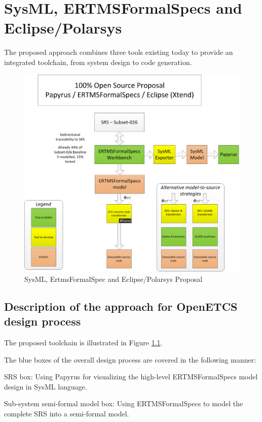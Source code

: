 \chapter{SysML, ERTMSFormalSpecs and Eclipse/Polarsys}
\label{sec:sysML-EFS}

The proposed approach combines three tools existing today to provide an integrated toolchain, from system design 
to code generation.

\begin{figure}
	\centering
		\includegraphics[width=1.10\textwidth]{images/ERTMSFormalSpecsProposal_V2.png}
		\caption{SysML, ErtmsFormalSpec and Eclipse/Polarsys Proposal}
	\label{fig:ERTMSFormalSpecsProposal}
\end{figure}

\section{Description of the approach for OpenETCS design process}

The proposed toolchain is illustrated in Figure \ref{fig:ERTMSFormalSpecsProposal}.

The blue boxes of the overall design process are covered in the following manner:

SRS box: Using Papyrus for visualizing the high-level ERTMSFormalSpecs model design in SysML language. 

Sub-system semi-formal model box: Using ERTMSFormalSpecs to model the complete SRS into a semi-formal model.

